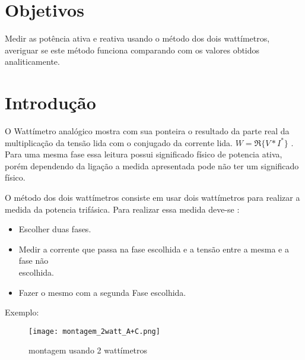 \documentclass[a4paper, 12pt]{article}
\begin{document}
	\section{Objetivos}
	
	\justifying
	Medir as potência ativa e reativa usando o método dos dois wattímetros, averiguar se este método funciona comparando com os valores obtidos analiticamente.
	\section{Introdução}
	
	\justifying
	O Wattímetro analógico mostra com sua ponteira o resultado da parte real da multiplicação
	da tensão lida com o conjugado da corrente lida. \(W = \Re\{V \ast I^\ast\}\) . Para uma mesma fase essa leitura possui significado físico de potencia ativa, porém dependendo da ligação a medida apresentada pode não ter um significado físico.
	
	O método dos dois wattímetros consiste em usar dois wattímetros para realizar a medida da potencia trifásica. Para realizar essa medida deve-se :
	\begin{itemize}
		\item Escolher duas fases.
		\item Medir a corrente que passa na  fase escolhida e a tensão entre a mesma e a fase não \\ escolhida.
		\item Fazer o mesmo com a segunda Fase escolhida.
	\end{itemize}
	Exemplo:\\
	\begin{figure}[H]
		\centering %
		\texttt{[image: montagem\_2watt\_A+C.png]}
		\caption{montagem usando 2 wattímetros}
	\end{figure}
	
\end{document}
